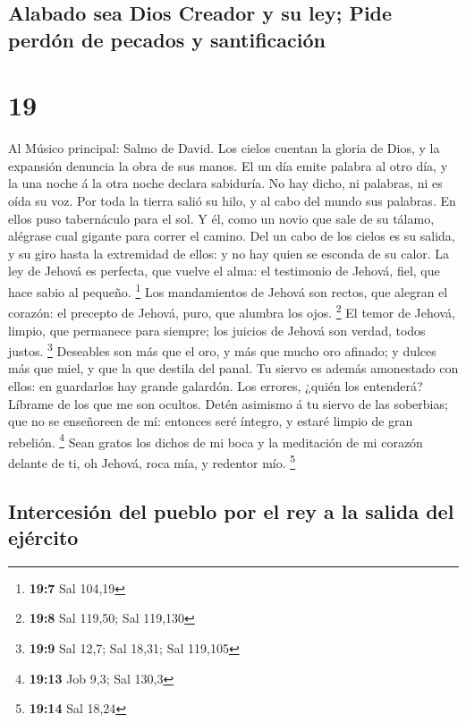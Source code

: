 \hypertarget{alabado-sea-dios-creador-y-su-ley-pide-perduxf3n-de-pecados-y-santificaciuxf3n}{%
\subsection{Alabado sea Dios Creador y su ley; Pide perdón de pecados y
santificación}\label{alabado-sea-dios-creador-y-su-ley-pide-perduxf3n-de-pecados-y-santificaciuxf3n}}

\hypertarget{section-18}{%
\section{19}\label{section-18}}

 Al Músico principal: Salmo de David. Los cielos cuentan la
gloria de Dios, y la expansión denuncia la obra de sus manos.
 El un día emite palabra al otro día, y la una noche á la
otra noche declara sabiduría.  No hay dicho, ni palabras, ni
es oída su voz.  Por toda la tierra salió su hilo, y al cabo
del mundo sus palabras. En ellos puso tabernáculo para el sol.
 Y él, como un novio que sale de su tálamo, alégrase cual
gigante para correr el camino.  Del un cabo de los cielos es
su salida, y su giro hasta la extremidad de ellos: y no hay quien se
esconda de su calor.  La ley de Jehová es perfecta, que
vuelve el alma: el testimonio de Jehová, fiel, que hace sabio al
pequeño. \footnote{\textbf{19:7} Sal 104,19}  Los
mandamientos de Jehová son rectos, que alegran el corazón: el precepto
de Jehová, puro, que alumbra los ojos. \footnote{\textbf{19:8} Sal
  119,50; Sal 119,130}  El temor de Jehová, limpio, que
permanece para siempre; los juicios de Jehová son verdad, todos justos.
\footnote{\textbf{19:9} Sal 12,7; Sal 18,31; Sal 119,105} 
Deseables son más que el oro, y más que mucho oro afinado; y dulces más
que miel, y que la que destila del panal.  Tu siervo es
además amonestado con ellos: en guardarlos hay grande galardón.
 Los errores, ¿quién los entenderá? Líbrame de los que me
son ocultos.  Detén asimismo á tu siervo de las soberbias;
que no se enseñoreen de mí: entonces seré íntegro, y estaré limpio de
gran rebelión. \footnote{\textbf{19:13} Job 9,3; Sal 130,3}
 Sean gratos los dichos de mi boca y la meditación de mi
corazón delante de ti, oh Jehová, roca mía, y redentor mío. \footnote{\textbf{19:14}
  Sal 18,24}

\hypertarget{intercesiuxf3n-del-pueblo-por-el-rey-a-la-salida-del-ejuxe9rcito}{%
\subsection{Intercesión del pueblo por el rey a la salida del
ejército}\label{intercesiuxf3n-del-pueblo-por-el-rey-a-la-salida-del-ejuxe9rcito}}

